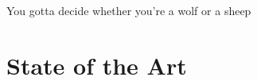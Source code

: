

\begin{savequote}[50mm]
You gotta decide whether you’re a wolf or a sheep
%
\end{savequote}


\chapter{State of the Art}
\label{cha:stateoftheart}

\ifpdf
    \graphicspath{{2_state_of_the_art/figures/PNG/}{2_state_of_the_art/figures/PDF/}{2_state_of_the_art/figures/}}
\else
    \graphicspath{{2_state_of_the_art/figures/EPS/}{2_state_of_the_art/figures/}}
\fi












